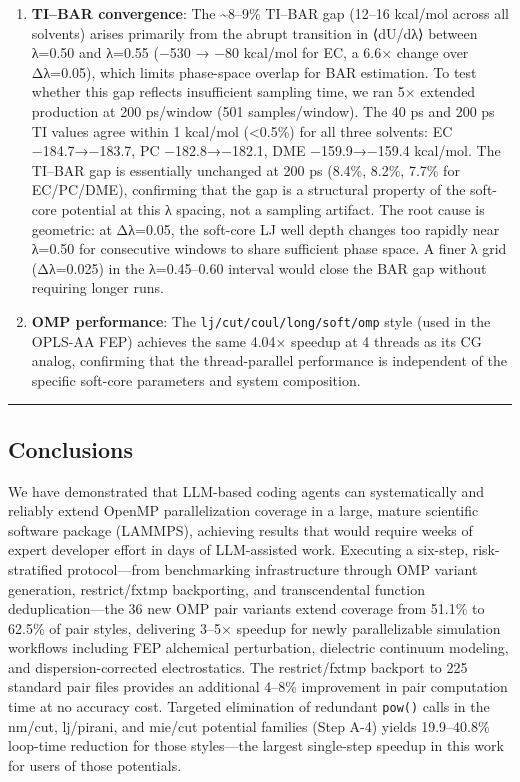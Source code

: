 \documentclass[
  11pt,
]{article}
\begin{document}
\begin{enumerate}
\def\labelenumi{\arabic{enumi}.}
\setcounter{enumi}{2}
\item
  \textbf{TI--BAR convergence}: The \textasciitilde8--9\% TI--BAR gap
  (12--16 kcal/mol across all solvents) arises primarily from the abrupt
  transition in ⟨dU/dλ⟩ between λ=0.50 and λ=0.55 (−530 → −80 kcal/mol
  for EC, a 6.6× change over Δλ=0.05), which limits phase-space overlap
  for BAR estimation. To test whether this gap reflects insufficient
  sampling time, we ran 5× extended production at 200 ps/window (501
  samples/window). The 40 ps and 200 ps TI values agree within 1
  kcal/mol (\textless0.5\%) for all three solvents: EC −184.7→−183.7, PC
  −182.8→−182.1, DME −159.9→−159.4 kcal/mol. The TI--BAR gap is
  essentially unchanged at 200 ps (8.4\%, 8.2\%, 7.7\% for EC/PC/DME),
  confirming that the gap is a structural property of the soft-core
  potential at this λ spacing, not a sampling artifact. The root cause
  is geometric: at Δλ=0.05, the soft-core LJ well depth changes too
  rapidly near λ=0.50 for consecutive windows to share sufficient phase
  space. A finer λ grid (Δλ=0.025) in the λ=0.45--0.60 interval would
  close the BAR gap without requiring longer runs.
\item
  \textbf{OMP performance}: The \texttt{lj/cut/coul/long/soft/omp} style
  (used in the OPLS-AA FEP) achieves the same 4.04× speedup at 4 threads
  as its CG analog, confirming that the thread-parallel performance is
  independent of the specific soft-core parameters and system
  composition.
\end{enumerate}

\begin{center}\rule{0.5\linewidth}{0.5pt}\end{center}

\subsection{Conclusions}\label{conclusions}

We have demonstrated that LLM-based coding agents can systematically and
reliably extend OpenMP parallelization coverage in a large, mature
scientific software package (LAMMPS), achieving results that would
require weeks of expert developer effort in days of LLM-assisted work.
Executing a six-step, risk-stratified protocol---from benchmarking
infrastructure through OMP variant generation, restrict/fxtmp
backporting, and transcendental function deduplication---the 36 new OMP
pair variants extend coverage from 51.1\% to 62.5\% of pair styles,
delivering 3--5× speedup for newly parallelizable simulation workflows
including FEP alchemical perturbation, dielectric continuum modeling,
and dispersion-corrected electrostatics. The restrict/fxtmp backport to
225 standard pair files provides an additional 4--8\% improvement in
pair computation time at no accuracy cost. Targeted elimination of
redundant \texttt{pow()} calls in the nm/cut, lj/pirani, and mie/cut
potential families (Step A-4) yields 19.9--40.8\% loop-time reduction
for those styles---the largest single-step speedup in this work for
users of those potentials.
\end{document}
